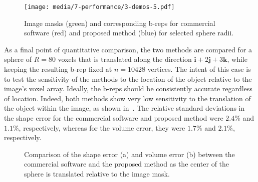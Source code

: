 \begin{figure}[ht!]
	\centering
	\texttt{[image: media/7-performance/3-demos-5.pdf]}
	\caption{Image masks (green) and corresponding b-reps for commercial software (red) and proposed method (blue) for selected sphere radii.}
	\label{fig:demos2}
\end{figure}
\noindent As a final point of quantitative comparison, the two methods are compared for a sphere of $R = 80$ voxels that is translated along the direction $\bm{i}  + 2\bm{j} + 3\bm{k}$, while keeping the resulting b-rep fixed at $n = 10428$ vertices. The intent of this case is to test the sensitivity of the methods to the location of the object relative to the image's voxel array. Ideally, the b-reps should be consistently accurate regardless of location.  Indeed, both methods show very low sensitivity to the translation of the object within the image, as shown in~. The relative standard deviations in the shape error for the commercial software and proposed method were $2.4\%$ and $1.1\%$, respectively, whereas for the volume error, they were $1.7\%$ and $2.1\%$, respectively. \\

\begin{figure}[b!]
	\centering
	\caption{Comparison of the shape error (a) and volume error (b) between the commercial software and the proposed method as the center of the sphere is translated relative to the image mask.}
	\label{fig:graph3}
\end{figure}

